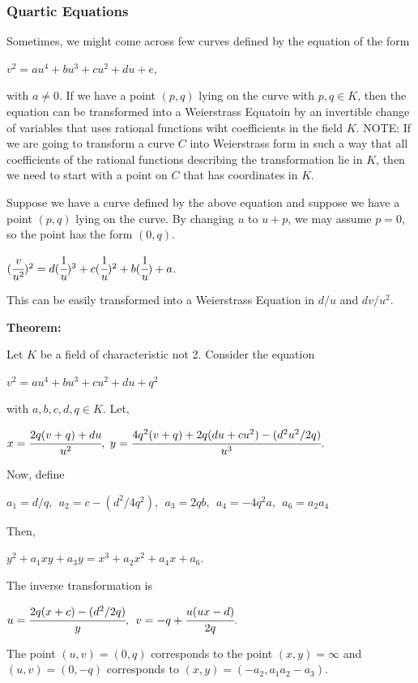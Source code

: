\documentclass[a4paper, 12pt]{article}
\begin{document}
\subsubsection{Quartic Equations}
Sometimes, we might come across few curves defined by the equation of the form
\begin{center}
$v^2=au^4+bu^3+cu^2+du+e,$
\end{center}
with $a \neq 0$. If we have a point $(p,q)$ lying on the curve with $p,q\in K$, then the equation can be transformed into a Weierstrass Equatoin by an invertible change of variables that uses rational functions wiht coefficients in the field $K$.
\newline
NOTE: If we are going to transform a curve $C$ into Weierstrass form in such a way that all coefficients of the rational functions describing the transformation lie in $K$, then we need to start with a point on $C$ that has coordinates in $K$.\par
Suppose we have a curve defined by the above equation and suppose we have a point $(p, q)$ lying on the curve. By changing $u$ to $u + p$, we may assume $p = 0$, so the point has the form $(0, q)$.
\begin{center}
$(\cfrac{v}{u^2})^2=d(\cfrac{1}{u})^3 + c(\cfrac{1}{u})^2 + b(\cfrac{1}{u}) + a$.
\end{center}
This can be easily transformed into a Weierstrass Equation in $d/u$ and $dv/u^2$. \par
\textbf{Theorem:}\par
Let $K$ be a field of characteristic not 2. Consider the equation
\begin{center}
$v^2=au^4+bu^3+cu^2+du+q^2$
\end{center}
with $a,b,c,d,q \in K.$ Let,
\begin{center}
$x = \cfrac{2q(v+q) + du}{u^2},$  \:\: $y = \cfrac{4q^2(v+q)+2q(du+cu^2)-(d^2u^2/2q)}{u^3}$.
\end{center}
Now, define
\begin{center}
$a_1 = d/q, \:\: a_2=c-(d^2/4q^2), \:\: a_3=2qb, \:\: a_4=-4q^2a, \:\: a_6=a_2a_4$
\end{center}
Then,
\begin{center}
$y^2 + a_1xy + a_3y = x^3 + a_2x^2 + a_4x + a_6.$
\end{center}
The inverse transformation is 
\begin{center}
$u =\cfrac{2q(x+c) - (d^2/2q)}{y}, \:\: v = -q+\cfrac{u(ux-d)}{2q}.$
\end{center}
The point $(u,v) = (0,q)$ corresponds to the point $(x,y)=\infty$ and $(u,v)=(0,-q)$ corresponds to $(x,y)=(-a_2,a_1a_2-a_3)$.
\end{document}
